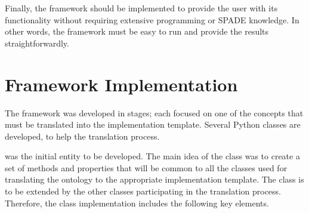 
Finally, the framework should be implemented to provide the user with its functionality without requiring extensive programming or \ac{SPADE} knowledge. In other words, the framework must be easy to run and provide the results straightforwardly.



\section{Framework Implementation}

The framework was developed in stages; each focused on one of the concepts that must be translated into the implementation template. Several Python classes are developed, to help the translation process.

%
was the initial entity to be developed. The main idea of the  class was to create a set of methods and properties that will be common to all the classes used for translating the ontology to the appropriate implementation template. The  class is to be extended by the other classes participating in the translation process. Therefore, the class implementation includes the following key elements.

